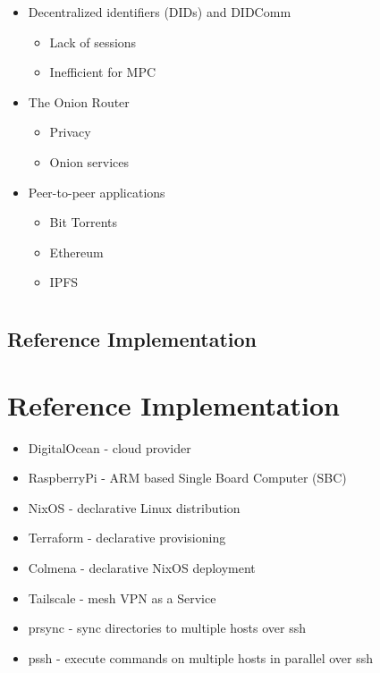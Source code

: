 \begin{itemize}
\tightlist
\item
  Decentralized identifiers (DIDs) and DIDComm

  \begin{itemize}
  \tightlist
  \item
    Lack of sessions
  \item
    Inefficient for MPC
  \end{itemize}
\item
  The Onion Router

  \begin{itemize}
  \tightlist
  \item
    Privacy
  \item
    Onion services
  \end{itemize}
\item
  Peer-to-peer applications

  \begin{itemize}
  \tightlist
  \item
    Bit Torrents
  \item
    Ethereum
  \item
    IPFS
  \end{itemize}
\end{itemize}

\hypertarget{section}{%
\chapter{}\label{section}}

\section{Reference Implementation}

\hypertarget{reference-implementation}{%
\chapter{Reference Implementation}\label{reference-implementation}}

\begin{itemize}
\tightlist
\item
  DigitalOcean - cloud provider
\item
  RaspberryPi - ARM based Single Board Computer (SBC)
\item
  NixOS - declarative Linux distribution
\item
  Terraform - declarative provisioning
\item
  Colmena - declarative NixOS deployment
\item
  Tailscale - mesh VPN as a Service
\item
  prsync - sync directories to multiple hosts over ssh
\item
  pssh - execute commands on multiple hosts in parallel over ssh
\end{itemize}

